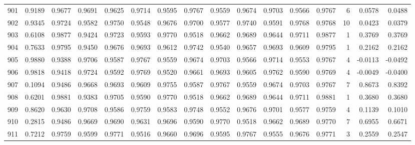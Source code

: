 \begin{tabular}{lrrrrrrrrrrrrrrr}
901 &      0.9189 &  0.9677 &  0.9691 &  0.9625 &  0.9714 &  0.9595 &  0.9767 &  0.9559 &  0.9674 &  0.9703 &   0.9566 &     0.9767 &      6 &                    0.0578 &                     0.0488 \\
902 &      0.9345 &  0.9724 &  0.9582 &  0.9750 &  0.9548 &  0.9676 &  0.9700 &  0.9577 &  0.9740 &  0.9591 &   0.9768 &     0.9768 &     10 &                    0.0423 &                     0.0379 \\
903 &      0.6108 &  0.9877 &  0.9424 &  0.9723 &  0.9593 &  0.9770 &  0.9518 &  0.9662 &  0.9689 &  0.9644 &   0.9711 &     0.9877 &      1 &                    0.3769 &                     0.3769 \\
904 &      0.7633 &  0.9795 &  0.9450 &  0.9676 &  0.9693 &  0.9612 &  0.9742 &  0.9540 &  0.9657 &  0.9693 &   0.9609 &     0.9795 &      1 &                    0.2162 &                     0.2162 \\
905 &      0.9880 &  0.9388 &  0.9706 &  0.9587 &  0.9767 &  0.9559 &  0.9674 &  0.9703 &  0.9566 &  0.9714 &   0.9553 &     0.9767 &      4 &                   -0.0113 &                    -0.0492 \\
906 &      0.9818 &  0.9418 &  0.9724 &  0.9592 &  0.9769 &  0.9520 &  0.9661 &  0.9693 &  0.9605 &  0.9762 &   0.9590 &     0.9769 &      4 &                   -0.0049 &                    -0.0400 \\
907 &      0.1094 &  0.9486 &  0.9668 &  0.9693 &  0.9609 &  0.9755 &  0.9587 &  0.9767 &  0.9559 &  0.9674 &   0.9703 &     0.9767 &      7 &                    0.8673 &                     0.8392 \\
908 &      0.6201 &  0.9881 &  0.9383 &  0.9705 &  0.9590 &  0.9770 &  0.9518 &  0.9662 &  0.9689 &  0.9644 &   0.9711 &     0.9881 &      1 &                    0.3680 &                     0.3680 \\
909 &      0.8620 &  0.9630 &  0.9708 &  0.9586 &  0.9759 &  0.9583 &  0.9748 &  0.9552 &  0.9676 &  0.9701 &   0.9577 &     0.9759 &      4 &                    0.1139 &                     0.1010 \\
910 &      0.2815 &  0.9486 &  0.9669 &  0.9690 &  0.9631 &  0.9696 &  0.9590 &  0.9770 &  0.9518 &  0.9662 &   0.9689 &     0.9770 &      7 &                    0.6955 &                     0.6671 \\
911 &      0.7212 &  0.9759 &  0.9599 &  0.9771 &  0.9516 &  0.9660 &  0.9696 &  0.9595 &  0.9767 &  0.9555 &   0.9676 &     0.9771 &      3 &                    0.2559 &                     0.2547 \\

\end{tabular}
